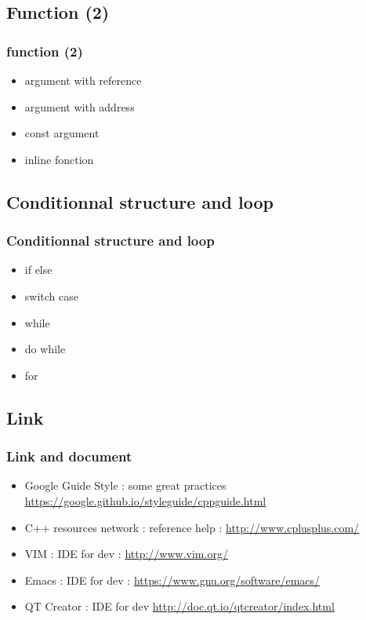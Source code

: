 \documentclass{beamer}
\begin{document}
\subsection{Function (2)}
\label{sub:function_2_}

\begin{frame}
	\frametitle{function (2)}
	\begin{itemize}
		\item argument with reference
		\item argument with address
		\item const argument
		\item inline fonction
	\end{itemize}
\end{frame}

\subsection{Conditionnal structure and loop}
\label{sub:condition}

\begin{frame}
	\frametitle{Conditionnal structure and loop}
	\begin{itemize}
		\item if else
		\item switch case
		\item while
		\item do while
		\item for
	\end{itemize}
\end{frame}

\subsection{Link}
\label{sub:link}

\begin{frame}
	\frametitle{Link and document}
	\begin{itemize}
		\item Google Guide Style : some great practices \url{https://google.github.io/styleguide/cppguide.html}
		\item C++ resources network : reference help : \url{http://www.cplusplus.com/}
		\item VIM : IDE for dev : \url{http://www.vim.org/} 
		\item Emacs : IDE for dev : \url{https://www.gnu.org/software/emacs/} 
		\item QT Creator : IDE for dev \url{http://doc.qt.io/qtcreator/index.html} 
	\end{itemize}
\end{frame}
\end{document}
